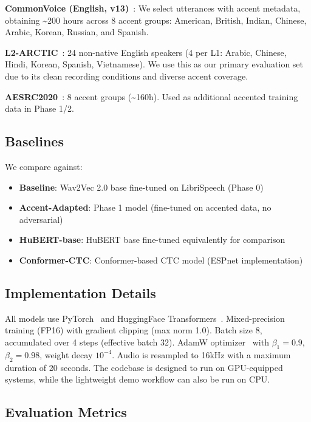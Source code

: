 \documentclass[10pt,twocolumn,letterpaper]{article}
\begin{document}
\textbf{CommonVoice (English, v13)}~\cite{ardila2020common}: We select utterances with accent metadata, obtaining \textasciitilde 200 hours across 8 accent groups: American, British, Indian, Chinese, Arabic, Korean, Russian, and Spanish.

\textbf{L2-ARCTIC}~\cite{zhao2018l2arctic}: 24 non-native English speakers (4 per L1: Arabic, Chinese, Hindi, Korean, Spanish, Vietnamese). We use this as our primary evaluation set due to its clean recording conditions and diverse accent coverage.

\textbf{AESRC2020}~\cite{shi2021accented}: 8 accent groups (\textasciitilde 160h). Used as additional accented training data in Phase 1/2.

\subsection{Baselines}

We compare against:
\begin{itemize}
    \item \textbf{Baseline}: Wav2Vec 2.0 base fine-tuned on LibriSpeech (Phase 0)
    \item \textbf{Accent-Adapted}: Phase 1 model (fine-tuned on accented data, no adversarial)
    \item \textbf{HuBERT-base}: HuBERT base fine-tuned equivalently for comparison
    \item \textbf{Conformer-CTC}: Conformer-based CTC model (ESPnet implementation)
\end{itemize}

\subsection{Implementation Details}

All models use PyTorch~\cite{paszke2019pytorch} and HuggingFace Transformers~\cite{wolf2020transformers}. Mixed-precision training (FP16) with gradient clipping (max norm 1.0). Batch size 8, accumulated over 4 steps (effective batch 32). AdamW optimizer~\cite{loshchilov2018decoupled} with $\beta_1=0.9$, $\beta_2=0.98$, weight decay $10^{-4}$. Audio is resampled to 16kHz with a maximum duration of 20 seconds. The codebase is designed to run on GPU-equipped systems, while the lightweight demo workflow can also be run on CPU.

\subsection{Evaluation Metrics}
\end{document}
